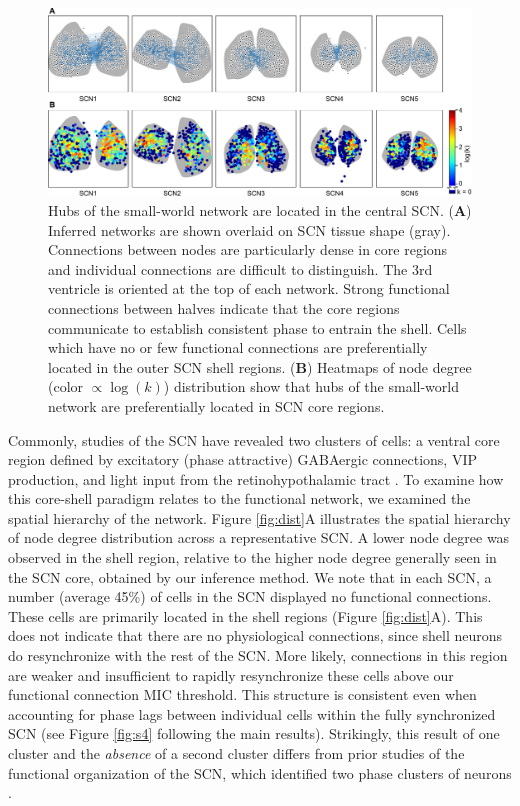 {\begin{figure}[p]
    \begin{center}
        \includegraphics[width=6.5in]{chap3/figures/s6.pdf}
    \end{center}
    \caption{\label{fig:s6}
    Hubs of the small-world network are located in the central SCN. 
    (\textbf{A}) Inferred networks are shown overlaid on SCN tissue shape (gray). Connections between nodes are particularly dense in core regions and individual connections are difficult to distinguish. The 3rd ventricle is oriented at the top of each network. Strong functional connections between halves indicate that the core regions communicate to establish consistent phase to entrain the shell. Cells which have no or few functional connections are preferentially located in the outer SCN shell regions.
    (\textbf{B}) Heatmaps of node degree (color $\propto \log (k)$) distribution show that hubs of the small-world network are preferentially located in SCN core regions.
}
\end{figure}
}


Commonly, studies of the SCN have revealed two clusters of cells: a ventral core region defined by excitatory (phase attractive) GABAergic connections, VIP production, and light input from the retinohypothalamic tract \cite{Albus2005, Evans2013, DeWoskin2015, Welsh2010}.
To examine how this core-shell paradigm relates to the functional network, we examined the spatial hierarchy of the network.
Figure \ref{fig:dist}A illustrates the spatial hierarchy of node degree distribution across a representative SCN.
A lower node degree was observed in the shell region, relative to the higher node degree generally seen in the SCN core, obtained by our inference method. 
We note that in each SCN, a number (average 45\%) of cells in the SCN displayed no functional connections.
These cells are primarily located in the shell regions (Figure \ref{fig:dist}A).
This does not indicate that there are no physiological connections, since shell neurons do resynchronize with the rest of the SCN.
More likely, connections in this region are weaker and insufficient to rapidly resynchronize these cells above our functional connection MIC threshold.
This structure is consistent even when accounting for phase lags between individual cells within the fully synchronized SCN (see Figure \ref{fig:s4} following the main results).
Strikingly, this result of one cluster and the \textit{absence} of a second cluster differs from prior studies of the functional organization of the SCN, which identified two phase clusters of neurons \cite{Evans2013}.


